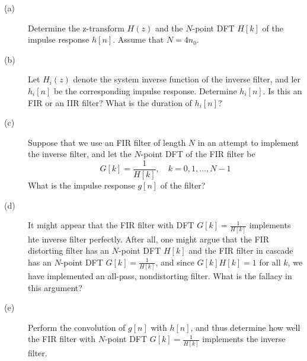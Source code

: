 \documentclass[11pt]{article}
\begin{document}
\begin{description}
\item[(a)] Determine the z-transform $H(z)$ and the $N$-point DFT $H[k]$ of the impulse response $h[n]$. Assume that $N = 4n_0$.
\item[(b)] Let $H_i(z)$ denote the system inverse function of the inverse filter, and ler $h_i[n]$ be the corresponding impulse response. Determine $h_i[n]$. Is this an FIR or an IIR filter? What is the duration of $h_i[n]$?
\item[(c)] Suppose that we use an FIR filter of length $N$ in an attempt to implement the inverse filter, and let the $N$-point DFT of the FIR filter be
\[ G[k]=\frac{1}{H[k]}, \quad k=0,1,\ldots,N-1 \]
What is the impulse response $g[n]$ of the filter?
\item[(d)] It might appear that the FIR filter with DFT $G[k]=\frac{1}{H[k]}$ implements hte inverse filter perfectly. After all, one might argue that the FIR distorting filter has an $N$-point DFT $H[k]$ and the FIR filter in cascade has an $N$-point DFT $G[k]=\frac{1}{H[k]}$, and since $G[k]H[k]=1$ for all $k$, we have implemented an all-pass, nondistorting filter. What is the fallacy in this argument?
\item[(e)] Perform the convolution of $g[n]$ with $h[n]$, and thus determine how well the FIR filter with $N$-point DFT $G[k]=\frac{1}{H[k]}$ implements the inverse filter.
\end{description}
\end{document}

